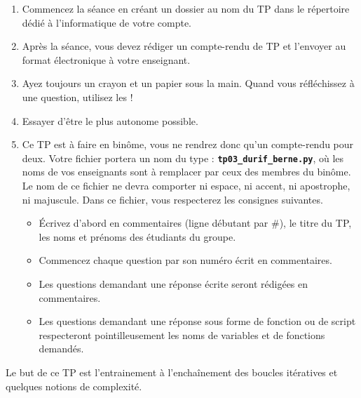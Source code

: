 \begin{enumerate}
\item Commencez la séance en créant un dossier au nom du TP dans le répertoire dédié à l'informatique de votre compte. 
\item Après la séance, vous devez rédiger un compte-rendu de TP et
l'envoyer au format électronique à votre enseignant.
\item Ayez toujours un crayon et un papier sous la main. Quand vous réfléchissez à une question, utilisez les !
\item Essayer d'être le plus autonome possible. 
\item Ce TP est à faire en binôme, vous ne rendrez donc qu'un  compte-rendu pour deux.
Votre fichier portera un nom du type : \textbf{\texttt{tp03\_durif\_berne.py}}, où les noms de vos enseignants sont à remplacer par ceux des membres du binôme. Le nom de ce 
fichier ne devra comporter ni espace, ni accent, ni apostrophe, ni majuscule.
Dans ce fichier, vous respecterez les consignes suivantes.
\begin{itemize}
  \item \'Ecrivez d'abord en commentaires (ligne débutant par \#), le titre du TP, les noms et prénoms des étudiants du groupe.
  \item Commencez chaque question par son numéro écrit en commentaires.
  \item Les questions demandant une réponse écrite seront rédigées en commentaires.
  \item Les questions demandant une réponse sous forme de fonction ou de script respecteront pointilleusement les noms de variables et de fonctions demandés.
\end{itemize}
\end{enumerate}

Le but de ce TP est l'entrainement à l'enchaînement des boucles itératives et quelques notions de complexité.

